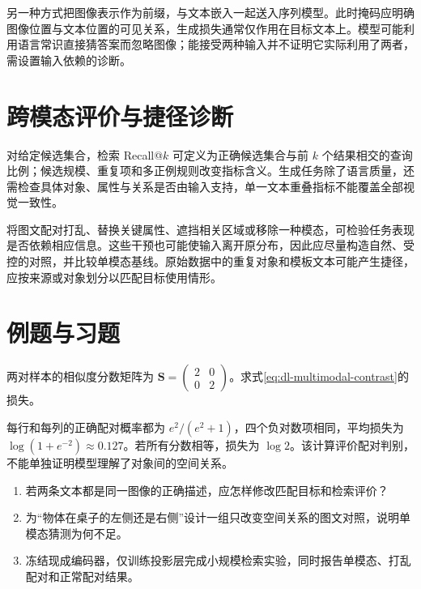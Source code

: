 另一种方式把图像表示作为前缀，与文本嵌入一起送入序列模型。此时掩码应明确图像位置与文本位置的可见关系，生成损失通常仅作用在目标文本上。模型可能利用语言常识直接猜答案而忽略图像；能接受两种输入并不证明它实际利用了两者，需设置输入依赖的诊断。

\section{跨模态评价与捷径诊断}
对给定候选集合，检索 Recall@$k$ 可定义为正确候选集合与前 $k$ 个结果相交的查询比例；候选规模、重复项和多正例规则改变指标含义。生成任务除了语言质量，还需检查具体对象、属性与关系是否由输入支持，单一文本重叠指标不能覆盖全部视觉一致性。

将图文配对打乱、替换关键属性、遮挡相关区域或移除一种模态，可检验任务表现是否依赖相应信息。这些干预也可能使输入离开原分布，因此应尽量构造自然、受控的对照，并比较单模态基线。原始数据中的重复对象和模板文本可能产生捷径，应按来源或对象划分以匹配目标使用情形。

\section{例题与习题}
\begin{example}[对称图文匹配]
两对样本的相似度分数矩阵为 $\mathbf S=\left(\begin{smallmatrix}2&0\\0&2\end{smallmatrix}\right)$。求式\eqref{eq:dl-multimodal-contrast}的损失。
\end{example}
\begin{solve}
每行和每列的正确配对概率都为 $e^2/(e^2+1)$，四个负对数项相同，平均损失为 $\log(1+e^{-2})\approx0.127$。若所有分数相等，损失为 $\log2$。该计算评价配对判别，不能单独证明模型理解了对象间的空间关系。
\end{solve}
\begin{enumerate}
\item 若两条文本都是同一图像的正确描述，应怎样修改匹配目标和检索评价？
\item 为“物体在桌子的左侧还是右侧”设计一组只改变空间关系的图文对照，说明单模态猜测为何不足。
\item 冻结现成编码器，仅训练投影层完成小规模检索实验，同时报告单模态、打乱配对和正常配对结果。
\end{enumerate}

